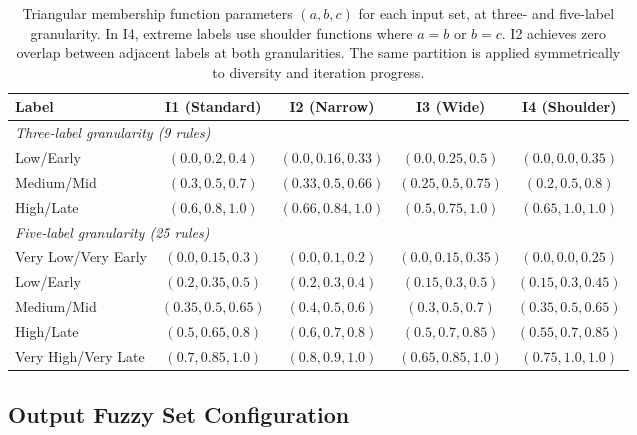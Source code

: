 \documentclass[conference]{IEEEtran}
\newcommand{\new}[1]{{\color{red}#1}}
\begin{document}
\begin{table}[htbp]
    \caption{\new{Triangular membership function parameters $(a, b, c)$ for each input set, at three- and five-label granularity. In I4, extreme labels use shoulder functions where $a{=}b$ or $b{=}c$. I2 achieves zero overlap between adjacent labels at both granularities. The same partition is applied symmetrically to diversity and iteration progress.}}
    \label{tab:input_sets_3L}
    \centering
    \footnotesize
    \setlength{\tabcolsep}{4pt}
    \begin{tabular}{lcccc}
    \toprule
    Label & I1 (Standard) & I2 (Narrow) & I3 (Wide) & I4 (Shoulder) \\
    \midrule
    \multicolumn{5}{l}{\emph{Three-label granularity (9 rules)}}\\
    Low/Early   & $(0.0, 0.2, 0.4)$ & $(0.0, 0.16, 0.33)$ & $(0.0, 0.25, 0.5)$ & $(0.0, 0.0, 0.35)$ \\
    Medium/Mid  & $(0.3, 0.5, 0.7)$ & $(0.33, 0.5, 0.66)$ & $(0.25, 0.5, 0.75)$ & $(0.2, 0.5, 0.8)$ \\
    High/Late   & $(0.6, 0.8, 1.0)$ & $(0.66, 0.84, 1.0)$ & $(0.5, 0.75, 1.0)$ & $(0.65, 1.0, 1.0)$ \\
    \midrule
    \multicolumn{5}{l}{\emph{Five-label granularity (25 rules)}}\\
    Very Low/Very Early & $(0.0, 0.15, 0.3)$  & $(0.0, 0.1, 0.2)$  & $(0.0, 0.15, 0.35)$  & $(0.0, 0.0, 0.25)$  \\
    Low/Early           & $(0.2, 0.35, 0.5)$  & $(0.2, 0.3, 0.4)$  & $(0.15, 0.3, 0.5)$ & $(0.15, 0.3, 0.45)$ \\
    Medium/Mid          & $(0.35, 0.5, 0.65)$ & $(0.4, 0.5, 0.6)$  & $(0.3, 0.5, 0.7)$  & $(0.35, 0.5, 0.65)$ \\
    High/Late           & $(0.5, 0.65, 0.8)$  & $(0.6, 0.7, 0.8)$  & $(0.5, 0.7, 0.85)$  & $(0.55, 0.7, 0.85)$ \\
    Very High/Very Late & $(0.7, 0.85, 1.0)$  & $(0.8, 0.9, 1.0)$  & $(0.65, 0.85, 1.0)$ & $(0.75, 1.0, 1.0)$  \\
    \bottomrule
    \end{tabular}
\end{table}

\subsection{Output Fuzzy Set Configuration}
\label{subsec:output_set}
\end{document}
